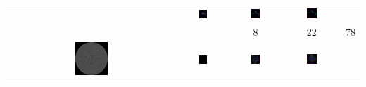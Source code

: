 \documentclass[10pt,a4paper,oneside]{article}
\theoremstyle{definition}
\begin{document}
\begin{table}[p]
\begin{tabular}{c c c c c}
& 
    \includegraphics[width=0.2\textwidth]{../img/runs2d/koch2/generation0008.png}
& 
    \includegraphics[width=0.2\textwidth]{../img/runs2d/koch2/generation0022.png}
& 
    \includegraphics[width=0.2\textwidth]{../img/runs2d/koch2/generation0078.png}
\\    
 &  & 8 & 22 & 78 \\
	\includegraphics[width=0.2\textwidth]{../img/runs2d/ball/data.png}
& 
    \includegraphics[width=0.2\textwidth]{../img/runs2d/ball/generation0000.png}
& 
    \includegraphics[width=0.2\textwidth]{../img/runs2d/ball/generation0003.png}
& 
    \includegraphics[width=0.2\textwidth]{../img/runs2d/ball/generation0024.png}

\end{tabular}
\end{table}
\end{document}
